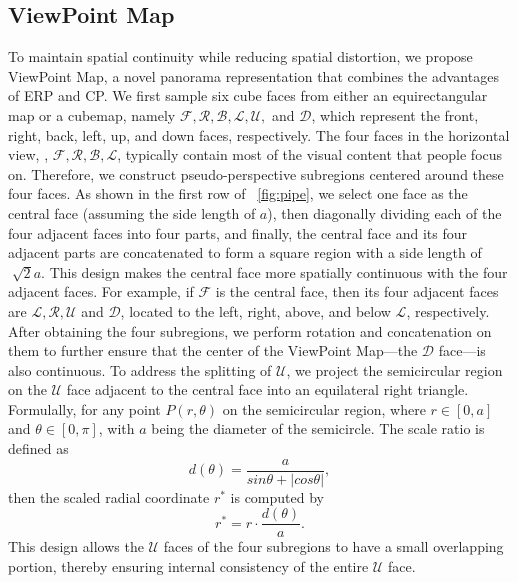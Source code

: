 \subsection{ViewPoint Map}
To maintain spatial continuity while reducing spatial distortion, we propose ViewPoint Map, a novel panorama representation that combines the advantages of ERP and CP. 
%
We first sample six cube faces from either an equirectangular map or a cubemap, namely $\mathcal{F,R,B,L,U,}$ and $\mathcal{D}$, which represent the front, right, back, left, up, and down faces, respectively.
%
The four faces in the horizontal view, \ie, $\mathcal{F,R,B,L}$, typically contain most of the visual content that people focus on.
%
Therefore, we construct pseudo-perspective subregions centered around these four faces. 
%
As shown in the first row of ~\cref{fig:pipe}, we select one face as the central face (assuming the side length of $a$), then diagonally dividing each of the four adjacent faces into four parts, and finally, the central face and its four adjacent parts are concatenated to form a square region with a side length of $\sqrt[]2a$. 
%
This design makes the central face more spatially continuous with the four adjacent faces.
%
For example, if $\mathcal{F}$ is the central face, then its four adjacent faces are $\mathcal{L,R,U}$ and $\mathcal{D}$, located to the left, right, above, and below $\mathcal{L}$, respectively.
%
After obtaining the four subregions, we perform rotation and concatenation on them to further ensure that the center of the ViewPoint Map—the $\mathcal{D}$ face—is also continuous.
%
To address the splitting of $\mathcal{U}$, we project the semicircular region on the $\mathcal{U}$ face adjacent to the central face into an equilateral right triangle.
%
Formulally, for any point $P (r, \theta)$ on the semicircular region, where $r \in [0, a]$ and $\theta \in [0, \pi]$, with $a$ being the diameter of the semicircle. The scale ratio is defined as 
\begin{equation}  
d(\theta) = \frac{a}{sin\theta+\lvert cos\theta \rvert},
\end{equation}
then the scaled radial coordinate $r^*$ is computed by
\begin{equation}  
r^* = r \cdot \frac{d(\theta)}{a}.
\end{equation}
%
This design allows the $\mathcal{U}$ faces of the four subregions to have a small overlapping portion, thereby ensuring internal consistency of the entire $\mathcal{U}$ face.

